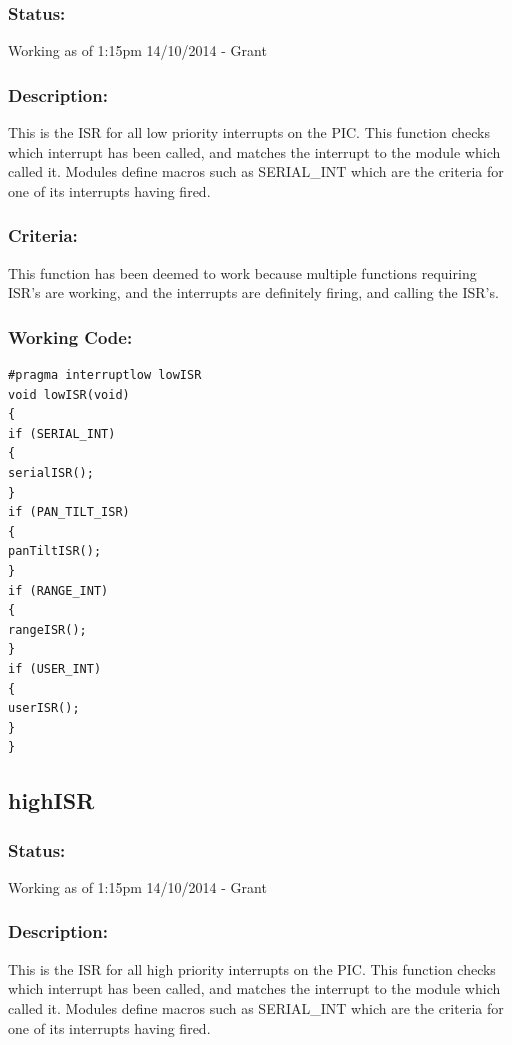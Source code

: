 \documentclass[]{report}
\begin{document}
\subsubsection{Status:}
Working as of 1:15pm 14/10/2014 - Grant

\subsubsection{Description:}
This is the ISR for all low priority interrupts on the PIC. This function checks which interrupt has been called, and matches the interrupt to the module which called it. Modules define macros such as SERIAL\_INT which are the criteria for one of its interrupts having fired.

\subsubsection{Criteria:}
This function has been deemed to work because multiple functions requiring ISR's are working, and the interrupts are definitely firing, and calling the ISR's.

\subsubsection{Working Code:}
\begin{lstlisting}
#pragma interruptlow lowISR
void lowISR(void)
{
if (SERIAL_INT)
{
serialISR();
}
if (PAN_TILT_ISR)
{
panTiltISR();
}
if (RANGE_INT)
{
rangeISR();
}
if (USER_INT)
{
userISR();
}
}
\end{lstlisting}

\subsection{highISR}
\subsubsection{Status:}
Working as of 1:15pm 14/10/2014 - Grant

\subsubsection{Description:}
This is the ISR for all high priority interrupts on the PIC. This function checks which interrupt has been called, and matches the interrupt to the module which called it. Modules define macros such as SERIAL\_INT which are the criteria for one of its interrupts having fired.
\end{document}
